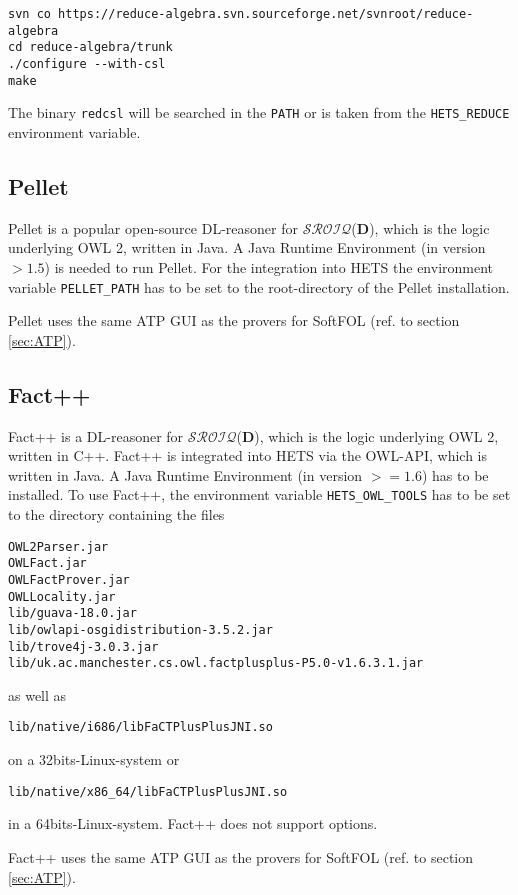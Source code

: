 \documentclass{article}
\newcommand{\normalTEXTSC}[2]{{#1\scriptsize#2}}
\newcommand     {\Hets}{\normalTEXTSC{H}{ETS}\xspace}
\newcommand{\SROIQ}{$\mathcal{SROIQ}$(\textbf{D})\xspace}
\newcommand{\DL}{DL\xspace}
\begin{document}
\begin{verbatim}
svn co https://reduce-algebra.svn.sourceforge.net/svnroot/reduce-algebra
cd reduce-algebra/trunk
./configure --with-csl
make
\end{verbatim}

The binary \texttt{redcsl} will be searched in the \texttt{PATH} or is taken
from the \texttt{HETS\_REDUCE} environment variable.

\subsection{Pellet}
Pellet is a popular open-source \DL-reasoner for \SROIQ, which is the logic
underlying OWL 2, written in Java. A Java Runtime Environment (in version $> 1.5$)
is needed to run Pellet. For the integration into \Hets the environment variable
\verb+PELLET_PATH+ has to be set to the root-directory of the Pellet installation.

Pellet uses the same ATP GUI as the provers for SoftFOL (ref. to section
\ref{sec:ATP}).
\subsection{Fact++}
Fact++ is a \DL-reasoner for \SROIQ, which is the logic underlying OWL 2, written in
C++. Fact++ is integrated into \Hets via the OWL-API, which is written in Java.
A Java Runtime Environment (in version $>= 1.6$) has to be installed. To use Fact++,
the environment variable \verb+HETS_OWL_TOOLS+ has to be set to the directory
containing the files
\begin{verbatim}
OWL2Parser.jar
OWLFact.jar
OWLFactProver.jar
OWLLocality.jar
lib/guava-18.0.jar
lib/owlapi-osgidistribution-3.5.2.jar
lib/trove4j-3.0.3.jar
lib/uk.ac.manchester.cs.owl.factplusplus-P5.0-v1.6.3.1.jar
\end{verbatim}
as well as
\begin{verbatim}
lib/native/i686/libFaCTPlusPlusJNI.so
\end{verbatim}
on a 32bits-Linux-system or
\begin{verbatim}
lib/native/x86_64/libFaCTPlusPlusJNI.so
\end{verbatim}
in a 64bits-Linux-system. Fact++ does not support options.

Fact++ uses the same ATP GUI as the provers for SoftFOL (ref. to section
\ref{sec:ATP}).
\end{document}
